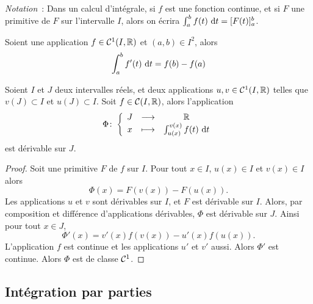 \emph{Notation}~: Dans un calcul d'intégrale, si \(f\) est une fonction 
continue,  et si \(F\) une primitive de \(F\) sur l'intervalle \(I\), alors on 
écrira \(\int_a^b f(t)\,\mathop{}\mathopen{}\mathrm{d} t=[F(t)]_a^b\).

\begin{corth}
  Soient une application \(f \in \mathcal{C}^{1}(I,\mathbb{R})\) et \((a,b) \in I^2\), alors
  \begin{equation}
    \int_a^b f'(t)\,\mathop{}\mathopen{}\mathrm{d} t=f(b)-f(a)
  \end{equation}
\end{corth}

\begin{prop}
  Soient \(I\) et \(J\) deux intervalles réels, et deux applications \(u,v \in 
  \mathcal{C}^{1}(I,\mathbb{R})\) telles que \(v(J) \subset I\) et \(u(J) \subset I\). Soit 
  \(f \in \mathcal{C}(I,\mathbb{R})\), alors l'application
  \begin{equation}
    \Phi\colon \left\{\begin{array}{ccc} J & \longrightarrow &\mathbb{R}\\ x & \longmapsto & \int_{u(x)}^{v(x)}f(t)\,\mathop{}\mathopen{}\mathrm{d} t \end{array} \right.
  \end{equation}
  est dérivable sur \(J\).
\end{prop}
\begin{proof}
  Soit une primitive \(F\) de \(f\) sur \(I\). Pour tout \(x \in I\), \(u(x) \in 
  I\) et \(v(x) \in I\) alors
  \begin{equation}
    \Phi(x) = F(v(x))-F(u(x)).
  \end{equation}
  Les applications \(u\) et \(v\) sont dérivables sur \(I\), et \(F\) est 
  dérivable sur \(I\). Alors, par composition et différence d'applications 
  dérivables, \(\Phi\) est dérivable sur \(J\). Ainsi pour tout \(x \in J\),
  \begin{equation}
    \Phi'(x) = v'(x)f(v(x)) -u'(x)f(u(x)).
  \end{equation}
  L'application \(f\) est continue et les applications \(u'\) et \(v'\) aussi. 
  Alors \(\Phi'\) est continue. Alors \(\Phi\) est de classe \(\mathcal{C}^{1}\).
\end{proof}

\subsection{Intégration par parties}

